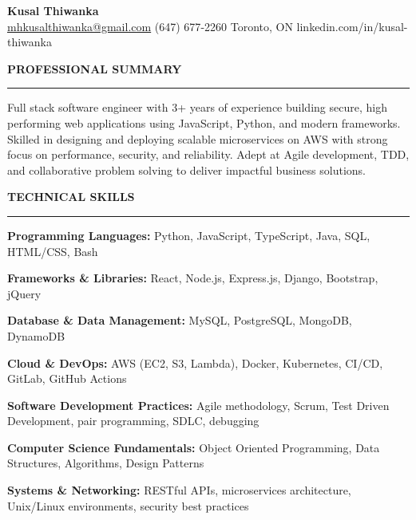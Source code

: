 \documentclass[10pt,letterpaper]{article}
\begin{document}
\begin{center}
{\LARGE\textbf{Kusal Thiwanka}}\\[1pt]
\href{mailto:mhkusalthiwanka@gmail.com}{mhkusalthiwanka@gmail.com}\hspace{2em}%
(647) 677{-}2260\hspace{2em}%
Toronto, ON\hspace{2em}
linkedin.com/in/kusal-thiwanka
\end{center}

\vspace{6pt}

\textbf{PROFESSIONAL SUMMARY}\\[-8pt]
\noindent\rule{\textwidth}{1pt}

\vspace{1pt}

Full stack software engineer with 3+ years of experience building secure, high performing web applications using JavaScript, Python, and modern frameworks. Skilled in designing and deploying scalable microservices on AWS with strong focus on performance, security, and reliability. Adept at Agile development, TDD, and collaborative problem solving to deliver impactful business solutions.

\vspace{3pt}

\textbf{TECHNICAL SKILLS}\\[-8pt]
\noindent\rule{\textwidth}{1pt}

\vspace{1pt}

\textbf{Programming Languages:} Python, JavaScript, TypeScript, Java, SQL, HTML/CSS, Bash

\textbf{Frameworks \& Libraries:} React, Node.js, Express.js, Django, Bootstrap, jQuery

\textbf{Database \& Data Management:} MySQL, PostgreSQL, MongoDB, DynamoDB

\textbf{Cloud \& DevOps:} AWS (EC2, S3, Lambda), Docker, Kubernetes, CI/CD, GitLab, GitHub Actions

\textbf{Software Development Practices:} Agile methodology, Scrum, Test Driven Development, pair programming, SDLC, debugging

\textbf{Computer Science Fundamentals:} Object Oriented Programming, Data Structures, Algorithms, Design Patterns

\textbf{Systems \& Networking:} RESTful APIs, microservices architecture, Unix/Linux environments, security best practices
\end{document}
